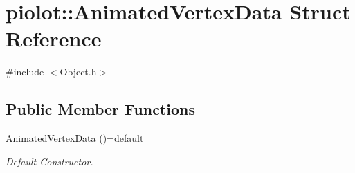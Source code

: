 \hypertarget{structpiolot_1_1_animated_vertex_data}{}\section{piolot\+:\+:Animated\+Vertex\+Data Struct Reference}
\label{structpiolot_1_1_animated_vertex_data}


{\ttfamily \#include $<$Object.\+h$>$}

\subsection*{Public Member Functions}
\begin{DoxyCompactItemize}
\item 
\mbox{\hyperlink{structpiolot_1_1_animated_vertex_data_a0f3f76292e605de2aa5ceb0148f1da74}{Animated\+Vertex\+Data}} ()=default
\begin{DoxyCompactList}\small\item\em Default Constructor. \end{DoxyCompactList}\end{DoxyCompactItemize}
